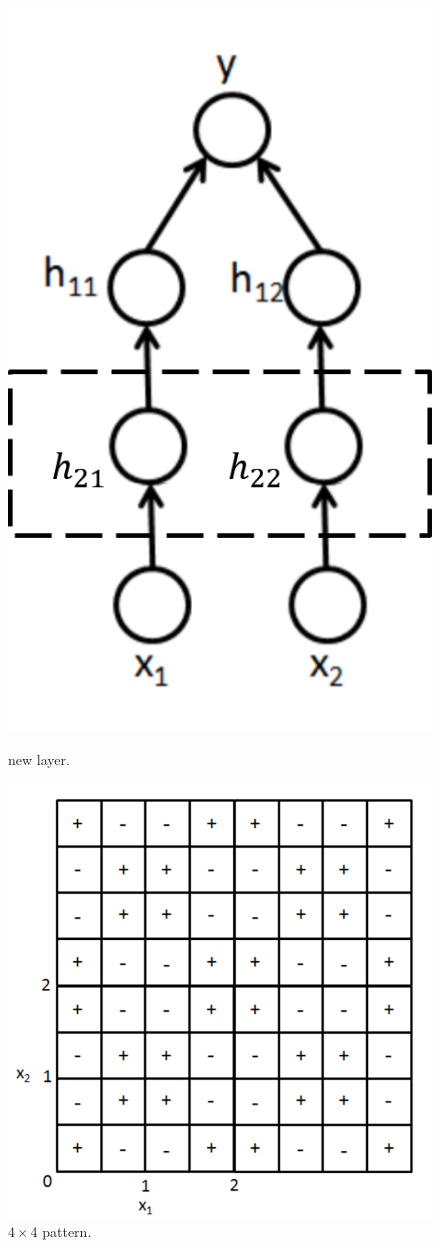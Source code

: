 \begin{figure}[ht]
\begin{minipage}[b]{0.45\linewidth}
\centering
    \includegraphics[width=0.5\linewidth]{fig/insert.png}
    \caption{\small
    new layer.}
    \label{fig:insert}
\end{minipage}
\hspace{0.5cm}
\begin{minipage}[b]{0.45\linewidth}
\centering
    \includegraphics[width=0.8\linewidth]{fig/4x4.png}
    \caption{\small
    $4\times 4$ pattern.}
    \label{fig:4x4}
\end{minipage}
\end{figure}

